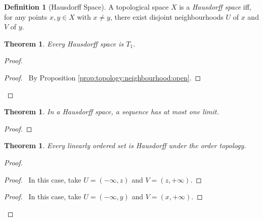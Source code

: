 \documentclass{report}
\let\qed\relax
\newtheorem{thm}[lm]{Theorem}
\theoremstyle{definition}
\newtheorem{df}[lm]{Definition}
\begin{document}
  \begin{df}[Hausdorff Space]
    A topological space $X$ is a \emph{Hausdorff space} iff, for any points $x,
    y
    \in X$ with $x \neq y$, there exist disjoint neighbourhoods $U$ of $x$ and
    $V$
    of $y$.
  \end{df}

  \begin{thm}
    Every Hausdorff space is $T_1$.
  \end{thm}

  \begin{proof}
    \pf
    \qedstep
    \begin{proof}
      \pf\ By Proposition \ref{prop:topology:neighbourhood:open}.
    \end{proof}
    \qed
  \end{proof}

  \begin{thm}
    In a Hausdorff space, a sequence has at most one limit.
  \end{thm}

  \begin{proof}
    \pf
    \qed
  \end{proof}

  \begin{thm}
    Every linearly ordered set is Hausdorff under the order topology.
  \end{thm}

  \begin{proof}
    \pf
    \begin{proof}
      \pf\ In this case, take $U = (-\infty, z)$ and $V = (z, +\infty)$.
    \end{proof}
    \begin{proof}
      \pf\ In this case, take $U = (-\infty, y)$ and $V = (x, +\infty)$.
    \end{proof}
    \qed
  \end{proof}
\end{document}
